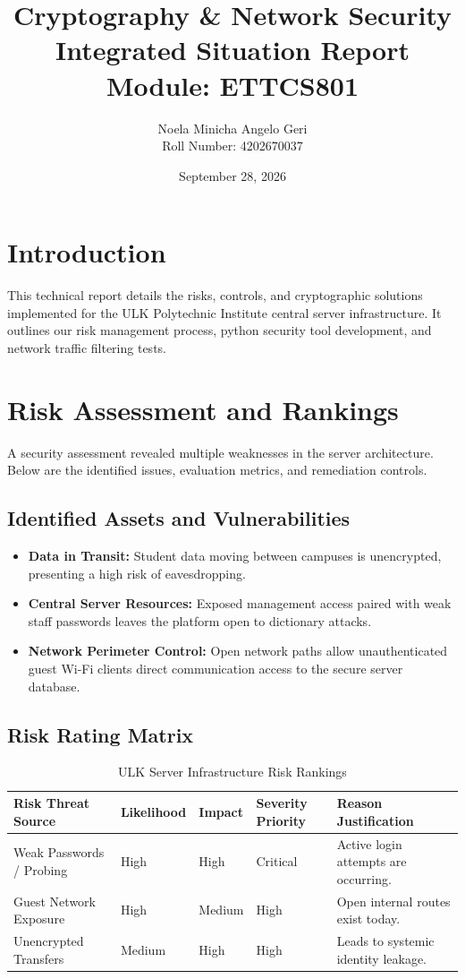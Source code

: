 \documentclass[11pt,a4paper]{article}
\title{Cryptography \& Network Security Integrated Situation Report\\ 
\large Module: ETTCS801}
\author{Noela Minicha Angelo Geri \\ \large Roll Number: 4202670037}
\date{September 28, 2026}
\begin{document}
\maketitle

\section{Introduction}
This technical report details the risks, controls, and cryptographic solutions implemented for the ULK Polytechnic Institute central server infrastructure. It outlines our risk management process, python security tool development, and network traffic filtering tests.

\section{Risk Assessment and Rankings}
A security assessment revealed multiple weaknesses in the server architecture. Below are the identified issues, evaluation metrics, and remediation controls.

\subsection{Identified Assets and Vulnerabilities}
\begin{itemize}
    \item \textbf{Data in Transit:} Student data moving between campuses is unencrypted, presenting a high risk of eavesdropping.
    \item \textbf{Central Server Resources:} Exposed management access paired with weak staff passwords leaves the platform open to dictionary attacks.
    \item \textbf{Network Perimeter Control:} Open network paths allow unauthenticated guest Wi-Fi clients direct communication access to the secure server database.
\end{itemize}

\subsection{Risk Rating Matrix}
\begin{table}[h!]
\centering
\begin{tabular}{lllll}
\toprule
Risk Threat Source & Likelihood & Impact & Severity Priority & Reason Justification \\
\midrule
Weak Passwords / Probing & High & High & Critical & Active login attempts are occurring. \\
Guest Network Exposure & High & Medium & High & Open internal routes exist today. \\
Unencrypted Transfers & Medium & High & High & Leads to systemic identity leakage. \\
\bottomrule
\end{tabular}
\caption{ULK Server Infrastructure Risk Rankings}
\label{tab:risks}
\end{table}
\end{document}
